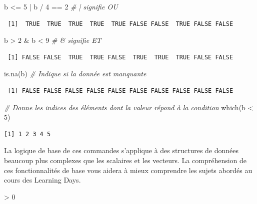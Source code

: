 \documentclass[
  12pt,
]{book}
\newenvironment{Shaded}{\begin{snugshade}}{\end{snugshade}}
\newcommand{\CommentTok}[1]{\textcolor[rgb]{0.56,0.35,0.01}{\textit{#1}}}
\newcommand{\DecValTok}[1]{\textcolor[rgb]{0.00,0.00,0.81}{#1}}
\newcommand{\FunctionTok}[1]{\textcolor[rgb]{0.00,0.00,0.00}{#1}}
\newcommand{\NormalTok}[1]{#1}
\newcommand{\SpecialCharTok}[1]{\textcolor[rgb]{0.00,0.00,0.00}{#1}}
\newlength{\cslhangindent}
\newenvironment{CSLReferences}[2] %
 {%
  \setlength{\parindent}{0pt}
  \ifodd #1 \everypar{\setlength{\hangindent}{\cslhangindent}}\ignorespaces\fi
  \ifnum #2 > 0
  \setlength{\parskip}{#2\baselineskip}
  \fi
 }%
 {}
\begin{document}
\begin{Shaded}
\begin{Highlighting}[]
\NormalTok{b }\SpecialCharTok{\textless{}=} \DecValTok{5} \SpecialCharTok{|}\NormalTok{ b }\SpecialCharTok{/} \DecValTok{4} \SpecialCharTok{==} \DecValTok{2} \CommentTok{\# | signifie OU}
\end{Highlighting}
\end{Shaded}

\begin{verbatim}
 [1]  TRUE  TRUE  TRUE  TRUE  TRUE FALSE FALSE  TRUE FALSE FALSE
\end{verbatim}

\begin{Shaded}
\begin{Highlighting}[]
\NormalTok{b }\SpecialCharTok{\textgreater{}} \DecValTok{2} \SpecialCharTok{\&}\NormalTok{ b }\SpecialCharTok{\textless{}} \DecValTok{9} \CommentTok{\# \& signifie ET}
\end{Highlighting}
\end{Shaded}

\begin{verbatim}
 [1] FALSE FALSE  TRUE  TRUE FALSE  TRUE  TRUE  TRUE FALSE FALSE
\end{verbatim}

\begin{Shaded}
\begin{Highlighting}[]
\FunctionTok{is.na}\NormalTok{(b) }\CommentTok{\# Indique si la donnée est manquante}
\end{Highlighting}
\end{Shaded}

\begin{verbatim}
 [1] FALSE FALSE FALSE FALSE FALSE FALSE FALSE FALSE FALSE FALSE
\end{verbatim}

\begin{Shaded}
\begin{Highlighting}[]
\CommentTok{\# Donne les indices des éléments dont la valeur répond à la condition}
\FunctionTok{which}\NormalTok{(b }\SpecialCharTok{\textless{}} \DecValTok{5}\NormalTok{)}
\end{Highlighting}
\end{Shaded}

\begin{verbatim}
[1] 1 2 3 4 5
\end{verbatim}

La logique de base de ces commandes s'applique à des structures de données beaucoup plus complexes que les scalaires et les vecteurs. La compréhension de ces fonctionnalités de base vous aidera à mieux comprendre les sujets abordés au cours des Learning Days.

\hypertarget{refs}{}
\begin{CSLReferences}{0}{0}
\end{CSLReferences}

\printbibliography
\end{document}
